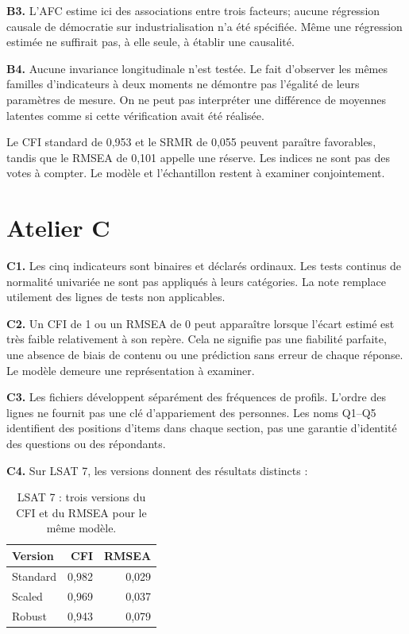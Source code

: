 \documentclass[
  french,
  11pt,
  a4paper,
  DIV=11,
  numbers=noendperiod]{scrreprt}
\begin{document}
\textbf{B3.} L'AFC estime ici des associations entre trois facteurs;
aucune régression causale de démocratie sur industrialisation n'a été
spécifiée. Même une régression estimée ne suffirait pas, à elle seule, à
établir une causalité.

\textbf{B4.} Aucune invariance longitudinale n'est testée. Le fait
d'observer les mêmes familles d'indicateurs à deux moments ne démontre
pas l'égalité de leurs paramètres de mesure. On ne peut pas interpréter
une différence de moyennes latentes comme si cette vérification avait
été réalisée.

Le CFI standard de 0,953 et le SRMR de 0,055 peuvent paraître
favorables, tandis que le RMSEA de 0,101 appelle une réserve. Les
indices ne sont pas des votes à compter. Le modèle et l'échantillon
restent à examiner conjointement.

\section{Atelier C}\label{atelier-c}

\textbf{C1.} Les cinq indicateurs sont binaires et déclarés ordinaux.
Les tests continus de normalité univariée ne sont pas appliqués à leurs
catégories. La note remplace utilement des lignes de tests non
applicables.

\textbf{C2.} Un CFI de 1 ou un RMSEA de 0 peut apparaître lorsque
l'écart estimé est très faible relativement à son repère. Cela ne
signifie pas une fiabilité parfaite, une absence de biais de contenu ou
une prédiction sans erreur de chaque réponse. Le modèle demeure une
représentation à examiner.

\textbf{C3.} Les fichiers développent séparément des fréquences de
profils. L'ordre des lignes ne fournit pas une clé d'appariement des
personnes. Les noms Q1--Q5 identifient des positions d'items dans chaque
section, pas une garantie d'identité des questions ou des répondants.

\textbf{C4.} Sur LSAT 7, les versions donnent des résultats distincts :


{

\begin{longtable}[]{@{}lrr@{}}

\caption{\label{tbl-lsat7}LSAT 7 : trois versions du CFI et du RMSEA
pour le même modèle.}

\tabularnewline

\toprule\noalign{}
Version & CFI & RMSEA \\
\midrule\noalign{}
\endhead
\bottomrule\noalign{}
\endlastfoot
Standard & 0,982 & 0,029 \\
Scaled & 0,969 & 0,037 \\
Robust & 0,943 & 0,079 \\

\end{longtable}

}
\end{document}
